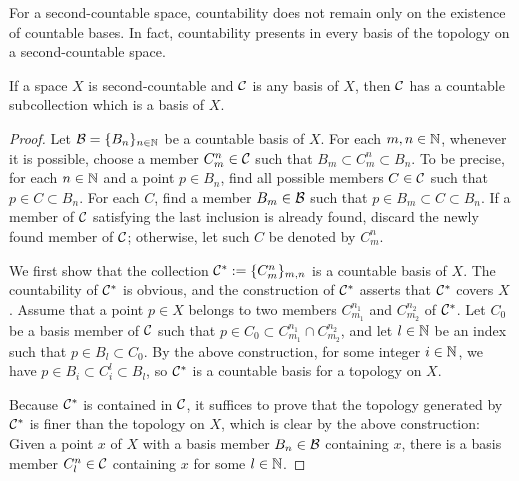 For a second-countable space, countability does not remain only on the existence of countable bases.
In fact, countability presents in every basis of the topology on a second-countable space.
\begin{prop}
    If a space $X$ is second-countable and ${\mathcal{C}}$ is any basis of $X$, then ${\mathcal{C}}$ has a countable subcollection which is a basis of $X$.
\end{prop}
\begin{proof}
    Let ${\mathcal{B}}=\{B_n\}_{n\in{\mathbb{N}}}$ be a countable basis of $X$.
    For each $m, n\in{\mathbb{N}}$, whenever it is possible, choose a member $C_m^n\in{\mathcal{C}}$ such that $B_m\subset C_m^n\subset B_n$.
    \color{magenta}To be precise, for each $n\in{\mathbb{N}}$ and a point $p\in B_n$, find all possible members $C\in{\mathcal{C}}$ such that $p\in C\subset B_n$.
    For each $C$, find a member $B_m\in{\mathcal{B}}$ such that $p\in B_m\subset C\subset B_n$.
    If a member of ${\mathcal{C}}$ satisfying the last inclusion is already found, discard the newly found member of ${\mathcal{C}}$; otherwise, let such $C$ be denoted by $C_m^n$.\color{black}
    
    We first show that the collection ${\mathcal{C}}^*:=\{C_m^n\}_{m, n}$ is a countable basis of $X$.
    The countability of ${\mathcal{C}}^*$ is obvious, and the construction of ${\mathcal{C}}^*$ asserts that ${\mathcal{C}}^*$ covers $X$.
    Assume that a point $p\in X$ belongs to two members $C_{m_1}^{n_1}$ and $C_{m_2}^{n_2}$ of ${\mathcal{C}}^*$.
    Let $C_0$ be a basis member of ${\mathcal{C}}$ such that $p\in C_0\subset C_{m_1}^{n_1}\cap C_{m_2}^{n_2}$, and let $l\in{\mathbb{N}}$ be an index such that $p\in B_l\subset C_0$.
    \color{magenta}By the above construction\color{black}, for some integer $i\in{\mathbb{N}}$, we have $p\in B_i\subset C_i^l\subset B_l$, so ${\mathcal{C}}^*$ is a countable basis for a topology on $X$.

    Because ${\mathcal{C}}^*$ is contained in ${\mathcal{C}}$, it suffices to prove that the topology generated by ${\mathcal{C}}^*$ is finer than the topology on $X$, which is clear \color{magenta}by the above construction\color{black}: Given a point $x$ of $X$ with a basis member $B_n\in{\mathcal{B}}$ containing $x$, there is a basis member $C_l^n\in{\mathcal{C}}$ containing $x$ for some $l\in{\mathbb{N}}$.
\end{proof}

